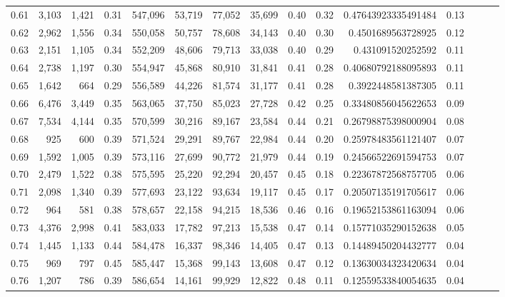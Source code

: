 \begin{tabular}{rrrrrrrrrrrrrrr}
0.61 &   3,103 &  1,421 &  0.31 &  547,096 &   53,719 &   77,052 &   35,699 &  0.40 &  0.32 &   0.47643923335491484 &      0.13 \\
0.62 &   2,962 &  1,556 &  0.34 &  550,058 &   50,757 &   78,608 &   34,143 &  0.40 &  0.30 &    0.4501689563728925 &      0.12 \\
0.63 &   2,151 &  1,105 &  0.34 &  552,209 &   48,606 &   79,713 &   33,038 &  0.40 &  0.29 &     0.431091520252592 &      0.11 \\
0.64 &   2,738 &  1,197 &  0.30 &  554,947 &   45,868 &   80,910 &   31,841 &  0.41 &  0.28 &   0.40680792188095893 &      0.11 \\
0.65 &   1,642 &    664 &  0.29 &  556,589 &   44,226 &   81,574 &   31,177 &  0.41 &  0.28 &    0.3922448581387305 &      0.11 \\
0.66 &   6,476 &  3,449 &  0.35 &  563,065 &   37,750 &   85,023 &   27,728 &  0.42 &  0.25 &   0.33480856045622653 &      0.09 \\
0.67 &   7,534 &  4,144 &  0.35 &  570,599 &   30,216 &   89,167 &   23,584 &  0.44 &  0.21 &   0.26798875398000904 &      0.08 \\
0.68 &     925 &    600 &  0.39 &  571,524 &   29,291 &   89,767 &   22,984 &  0.44 &  0.20 &   0.25978483561121407 &      0.07 \\
0.69 &   1,592 &  1,005 &  0.39 &  573,116 &   27,699 &   90,772 &   21,979 &  0.44 &  0.19 &   0.24566522691594753 &      0.07 \\
0.70 &   2,479 &  1,522 &  0.38 &  575,595 &   25,220 &   92,294 &   20,457 &  0.45 &  0.18 &   0.22367872568757705 &      0.06 \\
0.71 &   2,098 &  1,340 &  0.39 &  577,693 &   23,122 &   93,634 &   19,117 &  0.45 &  0.17 &   0.20507135191705617 &      0.06 \\
0.72 &     964 &    581 &  0.38 &  578,657 &   22,158 &   94,215 &   18,536 &  0.46 &  0.16 &   0.19652153861163094 &      0.06 \\
0.73 &   4,376 &  2,998 &  0.41 &  583,033 &   17,782 &   97,213 &   15,538 &  0.47 &  0.14 &   0.15771035290152638 &      0.05 \\
0.74 &   1,445 &  1,133 &  0.44 &  584,478 &   16,337 &   98,346 &   14,405 &  0.47 &  0.13 &   0.14489450204432777 &      0.04 \\
0.75 &     969 &    797 &  0.45 &  585,447 &   15,368 &   99,143 &   13,608 &  0.47 &  0.12 &   0.13630034323420634 &      0.04 \\
0.76 &   1,207 &    786 &  0.39 &  586,654 &   14,161 &   99,929 &   12,822 &  0.48 &  0.11 &   0.12559533840054635 &      0.04 \\

\end{tabular}
